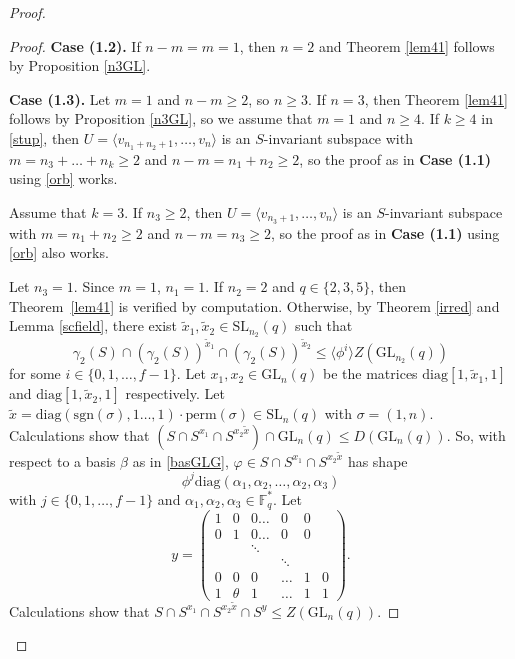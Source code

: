 \documentclass[a4paper,reqno,11pt]{amsart}
\theoremstyle{definition}
\theoremstyle{remark}
\numberwithin{equation}{section}
\newcommand{\diag}{\mathrm{diag}}
\newcommand{\sgn}{\mathrm{sgn}}
\newcommand{\per}{\mathrm{perm}}
\newcommand{\Reg}{\mathrm{Reg}}
\newcommand{\SL}{{\mathrm{SL}}}
\newcommand{\GL}{{\mathrm{GL}}}
\begin{document}
\begin{proof}
\begin{proof}
\medskip

{\bf Case (1.2).} If $n-m=m=1$, then $n=2$ and  Theorem \ref{lem41} follows by Proposition \ref{n3GL}.

\medskip

{\bf Case (1.3).} Let $m=1$ and $n-m \ge 2$, so $n \ge 3.$ %
If $n=3$, then Theorem \ref{lem41} follows by Proposition \ref{n3GL}, so we assume that $m=1$ and $n \ge 4.$ If $k\ge 4$ in \eqref{stup}, then $U = \langle v_{n_1+n_2+1}, \ldots, v_n \rangle$ is an $S$-invariant subspace with $m=n_3 + \ldots + n_k \ge 2$ and $n-m=n_1 +n_2 \ge 2$, so the proof as in {\bf Case (1.1)} using \eqref{orb} works.

 Assume that $k=3.$ If $n_3 \ge 2$, then    $U = \langle v_{n_3+1}, \ldots, v_n \rangle$ is an $S$-invariant subspace with $m=n_1 + n_2 \ge 2$ and $n-m=n_3 \ge 2$, so the proof as in {\bf Case (1.1)} using \eqref{orb} also works.

Let $n_3=1.$ Since $m=1$, $n_1=1.$ If $n_2=2$ and $q\in \{2,3,5\}$, then Theorem~\ref{lem41} is verified by computation. Otherwise, by Theorem \ref{irred} and Lemma \ref{scfield}, there exist $\tilde{x}_1,\tilde{x}_2 \in \SL_{n_2} (q)$  such that $$\gamma_2(S) \cap (\gamma_2(S))^{\tilde{x}_1} \cap (\gamma_2(S))^{\tilde{x}_2} \le \langle \phi^i \rangle Z(\GL_{n_2}(q))$$ for some $i \in \{0, 1, \ldots, f-1\}$. Let $x_1, x_2 \in \GL_n(q)$ be the matrices $\diag[1,\tilde{x}_1,1]$ and $\diag[1,\tilde{x}_2,1]$ respectively.  Let $\tilde{x}= \diag(\sgn(\sigma),1 \ldots, 1) \cdot \per(\sigma) \in \SL_n(q)$ with $\sigma=(1,n)$. Calculations show that $(S \cap S^{x_1} \cap S^{x_2 \tilde{x}}) \cap \GL_n(q) \le D(\GL_n(q)).$ So, with respect to a basis $\beta$ as in \eqref{basGLG},  $\varphi \in S \cap S^{x_1} \cap S^{x_2 \tilde{x}}$ has shape
$$\phi^j \diag(\alpha_1, \alpha_2, \ldots, \alpha_2, \alpha_3)$$ with $j \in \{0,1, \ldots, f-1\}$ and $\alpha_1, \alpha_2, \alpha_3 \in \mathbb{F}_q^*.$ Let 
$$y=
\begin{pmatrix}
1& 0      & 0\ldots  & 0 &0 \\
0& 1      & 0 \ldots  & 0 &0\\
&       &\ddots &  &  &\\
&       & & \ddots &  &\\
0& 0      & 0& \ldots & 1 &0 \\
1& \theta & 1& \ldots & 1 &1
\end{pmatrix}.$$
Calculations show that $S \cap S^{x_1} \cap S^{x_2 \tilde{x}} \cap S^y \le Z(\GL_n(q)).$ 


\end{proof}
\end{proof}
\end{document}
